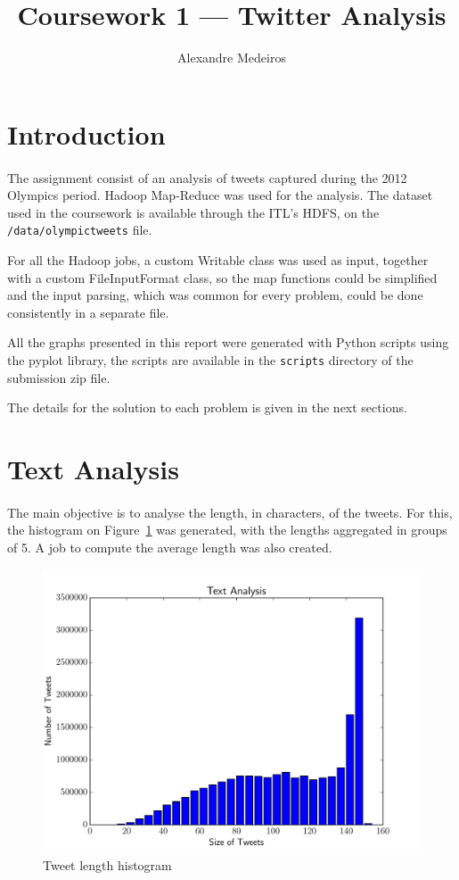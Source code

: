 \documentclass[10pt,a4paper]{article}
\title{Coursework 1 --- Twitter Analysis}
\author{Alexandre Medeiros}
\begin{document}
\maketitle

\section{Introduction}

\paragraph*{}
The assignment consist of an analysis of tweets captured during the 2012
Olympics period. Hadoop Map-Reduce was used for the analysis.  The dataset used
in the coursework is available through the ITL's HDFS, on the {\tt
/data/olympictweets} file.

For all the Hadoop jobs, a custom Writable class was used as input, together
with a custom FileInputFormat class, so the map functions could be simplified
and the input parsing, which was common for every problem, could be done
consistently in a separate file.

All the graphs presented in this report were generated with Python scripts using
the pyplot library, the scripts are available in the {\tt scripts} directory of
the submission zip file.

The details for the solution to each problem is given in the next sections.

\section{Text Analysis}

\paragraph*{}
The main objective is to analyse the length, in characters, of the tweets. For
this, the histogram on Figure~\ref{fig::text} was generated, with the lengths
aggregated in groups of 5. A job to compute the average length was also created.

\begin{figure}[!b]
    \centering
    \includegraphics[width=.7\textwidth]{imgs/text-analysis}
    \caption{Tweet length histogram}\label{fig::text}
\end{figure}
\end{document}
